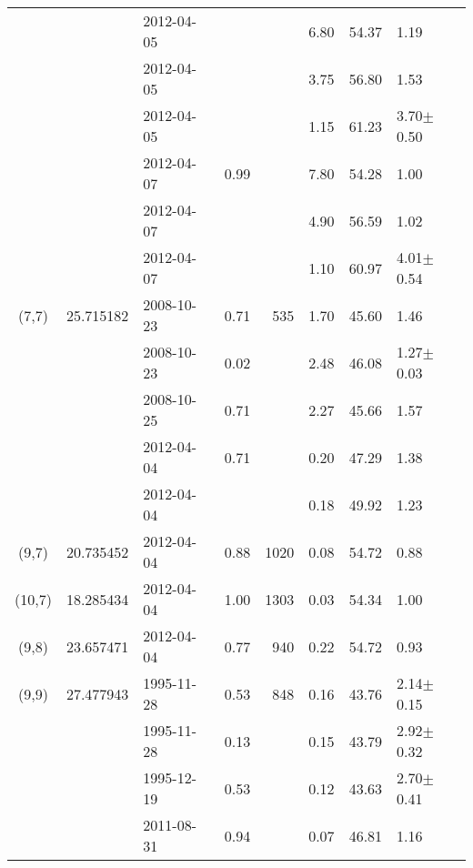 \documentclass[oldversion]{aa}
\begin{document}
\begin{table*}
\begin{flushleft}
\begin{tabular}{cclcrccl}
          &           & 2012-04-05    &                &                 & 6.80  & 54.37 & 1.19             \\
          &           & 2012-04-05    &                &                 & 3.75  & 56.80 & 1.53             \\
          &           & 2012-04-05    &                &                 & 1.15  & 61.23 & 3.70$\pm$0.50    \\
          &           & 2012-04-07    &  0.99          &                 & 7.80  & 54.28 & 1.00             \\
          &           & 2012-04-07    &                &                 & 4.90  & 56.59 & 1.02             \\
          &           & 2012-04-07    &                &                 & 1.10  & 60.97 & 4.01$\pm$0.54    \\
  (7,7)   & 25.715182 & 2008-10-23 &  0.71          &   535           & 1.70  & 45.60 & 1.46             \\
          &           & 2008-10-23    &  0.02          &                 & 2.48  & 46.08 & 1.27$\pm$0.03    \\
          &           & 2008-10-25 &  0.71          &                 & 2.27  & 45.66 & 1.57             \\
          &           & 2012-04-04 &  0.71          &                 & 0.20  & 47.29 & 1.38             \\
          &           & 2012-04-04    &                &                 & 0.18  & 49.92 & 1.23             \\
  (9,7)   & 20.735452 & 2012-04-04 &  0.88          &  1020           & 0.08  & 54.72 & 0.88             \\
 (10,7)   & 18.285434 & 2012-04-04 &  1.00          &  1303           & 0.03  & 54.34 & 1.00             \\
  (9,8)   & 23.657471 & 2012-04-04 &  0.77          &   940           & 0.22  & 54.72 & 0.93             \\
  (9,9)   & 27.477943 & 1995-11-28 &  0.53          &   848           & 0.16  & 43.76 & 2.14$\pm$0.15    \\
          &           & 1995-11-28    &  0.13          &                 & 0.15  & 43.79 & 2.92$\pm$0.32    \\
          &           & 1995-12-19 &  0.53          &                 & 0.12  & 43.63 & 2.70$\pm$0.41    \\
          &           & 2011-08-31 &  0.94          &                 & 0.07  & 46.81 & 1.16             \\

\end{tabular}
\end{flushleft}
\end{table*}
\end{document}
